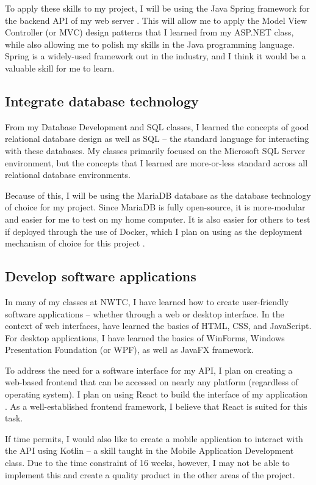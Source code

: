 \documentclass[letterpaper,11pt]{../templates/texMemo}
\begin{document}
    To apply these skills to my project, I will be using the Java Spring framework for the backend API of my web server \parencite{spring_project_2022}. This will allow me to apply the Model View Controller (or MVC) design patterns that I learned from my ASP.NET class, while also allowing me to polish my skills in the Java programming language. Spring is a widely-used framework out in the industry, and I think it would be a valuable skill for me to learn.

    \subsection{Integrate database technology}
    From my Database Development and SQL classes, I learned the concepts of good relational database design as well as SQL -- the standard language for interacting with these databases. My classes primarily focused on the Microsoft SQL Server environment, but the concepts that I learned are more-or-less standard across all relational database environments.

    Because of this, I will be using the MariaDB database as the database technology of choice for my project. Since MariaDB is fully open-source, it is more-modular and easier for me to test on my home computer. It is also easier for others to test if deployed through the use of Docker, which I plan on using as the deployment mechanism of choice for this project \parencite{docker_website_2022}.

    \subsection{Develop software applications}
    In many of my classes at NWTC, I have learned how to create user-friendly software applications -- whether through a web or desktop interface. In the context of web interfaces, have learned the basics of HTML, CSS, and JavaScript. For desktop applications, I have learned the basics of WinForms, Windows Presentation Foundation (or WPF), as well as JavaFX framework.

    To address the need for a software interface for my API, I plan on creating a web-based frontend that can be accessed on nearly any platform (regardless of operating system). I plan on using React to build the interface of my application \parencite{react_website_2022}. As a well-established frontend framework, I believe that React is suited for this task.

    If time permits, I would also like to create a mobile application to interact with the API using Kotlin -- a skill taught in the Mobile Application Development class. Due to the time constraint of 16 weeks, however, I may not be able to implement this and create a quality product in the other areas of the project.
\end{document}
